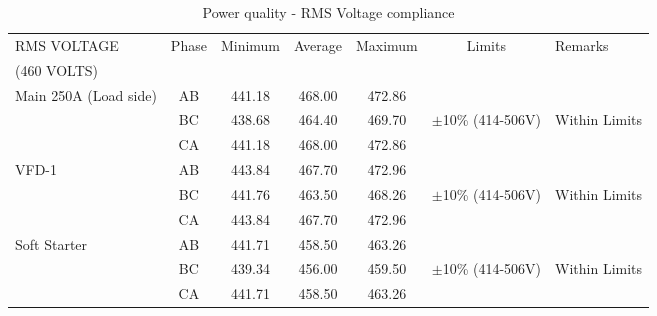 \begin{table}[!htb]
	\caption{Power quality - RMS Voltage compliance}
	\label{tbl_ch04_elecaudit_powerquality_rms}
	{\scriptsize
		
		\begin{tabular}{l|l|l|l|l|p{2cm}|l}
\hline
RMS VOLTAGE & \multicolumn{1}{c|}{Phase} & \multicolumn{1}{c|}{Minimum} & \multicolumn{1}{c|}{Average} & \multicolumn{1}{c|}{Maximum} & \multicolumn{1}{c|}{Limits} & Remarks \\ 
(460 VOLTS) & \multicolumn{1}{c|}{} & \multicolumn{1}{c|}{} & \multicolumn{1}{c|}{} & \multicolumn{1}{c|}{} & \multicolumn{1}{c|}{} &  \\ 
\hline
Main 250A (Load side) & \multicolumn{1}{c|}{AB} & \multicolumn{1}{c|}{441.18} & \multicolumn{1}{c|}{468.00} & \multicolumn{1}{c|}{472.86} & \multicolumn{1}{c|}{} &  \\ 
& \multicolumn{1}{c|}{BC} & \multicolumn{1}{c|}{438.68} & \multicolumn{1}{c|}{464.40} & \multicolumn{1}{c|}{469.70} & \multicolumn{1}{c|}{$\pm $10\% (414-506V)} & Within  Limits \\ 
& \multicolumn{1}{c|}{CA} & \multicolumn{1}{c|}{441.18} & \multicolumn{1}{c|}{468.00} & \multicolumn{1}{c|}{472.86} & \multicolumn{1}{c|}{} &  \\ 
\hline
VFD-1 & \multicolumn{1}{c|}{AB} & \multicolumn{1}{c|}{443.84} & \multicolumn{1}{c|}{467.70} & \multicolumn{1}{c|}{472.96} & \multicolumn{1}{c|}{} &  \\ 
& \multicolumn{1}{c|}{BC} & \multicolumn{1}{c|}{441.76} & \multicolumn{1}{c|}{463.50} & \multicolumn{1}{c|}{468.26} & \multicolumn{1}{c|}{$\pm $10\% (414-506V)} & Within Limits \\ 
& \multicolumn{1}{c|}{CA} & \multicolumn{1}{c|}{443.84} & \multicolumn{1}{c|}{467.70} & \multicolumn{1}{c|}{472.96} & \multicolumn{1}{c|}{} &  \\ 
\hline
Soft Starter & \multicolumn{1}{c|}{AB} & \multicolumn{1}{c|}{441.71} & \multicolumn{1}{c|}{458.50} & \multicolumn{1}{c|}{463.26} & \multicolumn{1}{c|}{} &  \\ 
& \multicolumn{1}{c|}{BC} & \multicolumn{1}{c|}{439.34} & \multicolumn{1}{c|}{456.00} & \multicolumn{1}{c|}{459.50} & \multicolumn{1}{c|}{$\pm $10\% (414-506V)} & Within Limits \\ 
& \multicolumn{1}{c|}{CA} & \multicolumn{1}{c|}{441.71} & \multicolumn{1}{c|}{458.50} & \multicolumn{1}{c|}{463.26} & \multicolumn{1}{c|}{} &  \\ 
\hline
			
		\end{tabular}
		
	}%
\end{table}